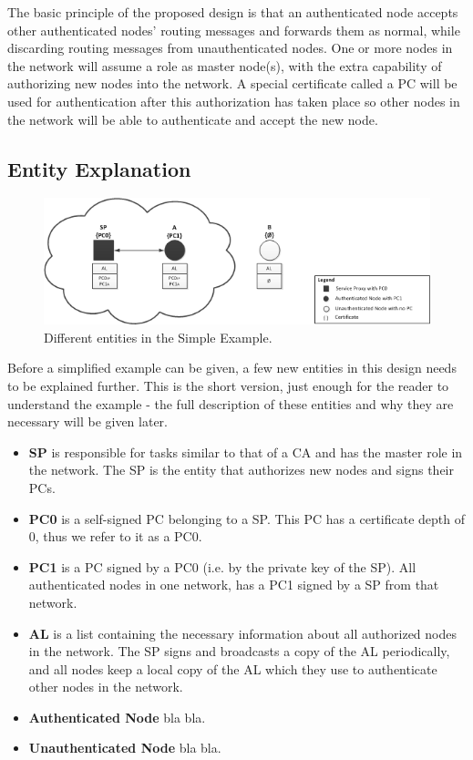 The basic principle of the proposed design is that an authenticated node accepts
other authenticated nodes' routing messages and forwards them as normal, while
discarding routing messages from unauthenticated nodes. One or more nodes in the
network will assume a role as master node(s), with the extra capability of
authorizing new nodes into the network. A special certificate called a \ac{PC}
\cite{tuecke2004rfc3820} will be used for authentication after this authorization has taken
place so other nodes in the network will be able to authenticate and accept the new
node.


\subsection{Entity Explanation}

\begin{figure}[ht!]
	\centering
  	\includegraphics{images/simple_example_entities.png}
  	\caption{Different entities in the Simple Example.}
	\label{fig:simple_example_entities}
\end{figure}

Before a simplified example can be given, a few new entities in this design
needs to be explained further. This is the short version, just enough for the
reader to understand the example - the full description of these entities
and why they are necessary will be given later.

\begin{itemize}
  \item \textbf{\acf{SP}} is responsible for tasks similar to that of a \ac{CA}
  	and has the master role in the network. The \ac{SP} is the entity that
 	 authorizes new nodes and signs their \acp{PC}.
  \item \textbf{\acf{PC0}} is a self-signed \ac{PC} belonging to a
  	\ac{SP}. This \ac{PC} has a certificate depth of 0, thus we refer to it as a
  	\ac{PC0}.
  \item \textbf{\acf{PC1}} is a \ac{PC} signed by a \ac{PC0} (i.e. by the
  private key of the \ac{SP}). All authenticated nodes in one network, has a
  \ac{PC1} signed by a \ac{SP} from that network.
  \item \textbf{\acf{AL}} is a list containing the necessary information about
 	all authorized nodes in the network. The \ac{SP} signs and broadcasts a copy
 	of the \ac{AL} periodically, and all nodes keep a local copy of the \ac{AL}
  	which they use to authenticate other nodes in the network.
  \item \textbf{Authenticated Node} bla bla.
  \item \textbf{Unauthenticated Node} bla bla.
\end{itemize}

